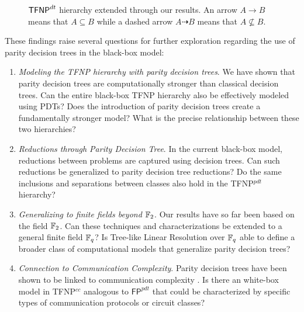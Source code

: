 \begin{figure}[H]

    
    \caption{$\mathsf{TFNP}^{dt}$ hierarchy extended through our results. An arrow $A \to B$ means that $A \subseteq B$ while a dashed arrow $A \dashrightarrow B$ means that $A \not\subseteq B$.}   
\end{figure} 

\noindent
These findings raise several questions for further exploration regarding the use of parity decision trees in the black-box model:
\begin{enumerate}
    \item \textit{Modeling the \textsf{TFNP} hierarchy with parity decision trees}. We have shown that parity decision trees are computationally stronger than classical decision trees. Can the entire black-box \textsf{TFNP} hierarchy also be effectively modeled using PDTs? Does the introduction of parity decision trees create a fundamentally stronger model? What is the precise relationship between these two hierarchies?
    \item \textit{Reductions through Parity Decision Tree}. In the current black-box model, reductions between problems are captured using decision trees. Can such reductions be generalized to parity decision tree reductions? Do the same inclusions and separations between classes also hold in the \textsf{TFNP}$^{pdt}$ hierarchy?
    \item \textit{Generalizing to finite fields beyond $\mathbb{F}_2$}. Our results have so far been based on the field $\mathbb{F}_2$. Can these techniques and characterizations be extended to a general finite field $\mathbb{F}_q$? Is Tree-like Linear Resolution over $\mathbb{F}_q$ able to define a broader class of computational models that generalize parity decision trees?
    \item \textit{Connection to Communication Complexity}. Parity decision trees have been shown to be linked to communication complexity  \cite{pdts_comm_compl}. Is there an white-box model in \textsf{TFNP}$^{cc}$ analogous to $\textsf{FP}^{pdt}$ that could be characterized by specific types of communication protocols or circuit classes?

\end{enumerate}

